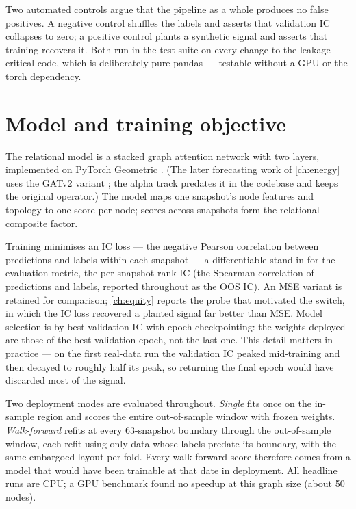 Two automated controls argue that the pipeline as a whole produces no
false positives. A negative control shuffles the labels and asserts that
validation IC collapses to zero; a positive control plants a synthetic
signal and asserts that training recovers it. Both run in the test suite
on every change to the leakage-critical code, which is deliberately pure
pandas --- testable without a GPU or the torch dependency.

\section{Model and training objective}
\label{sec:training}

The relational model is a stacked graph attention network
\cite{velickovic2018gat} with two layers, implemented on PyTorch
Geometric \cite{fey2019pyg}. (The later forecasting work of
\cref{ch:energy} uses the GATv2 variant \cite{brody2022gatv2}; the alpha
track predates it in the codebase and keeps the original operator.) The
model maps one snapshot's node features and topology to one score per
node; scores across snapshots form the relational composite factor.

Training minimises an IC loss --- the negative Pearson correlation
between predictions and labels within each snapshot --- a differentiable
stand-in for the evaluation metric, the per-snapshot rank-IC (the
Spearman correlation of predictions and labels, reported throughout as
the OOS IC). An MSE variant is retained for comparison;
\cref{ch:equity} reports the probe that motivated the switch, in which
the IC loss recovered a planted signal far better than MSE. Model
selection is by best validation IC with epoch checkpointing: the weights
deployed are those of the best validation epoch, not the last one. This
detail matters in practice --- on the first real-data run the validation
IC peaked mid-training and then decayed to roughly half its peak, so
returning the final epoch would have discarded most of the signal.

Two deployment modes are evaluated throughout. \emph{Single} fits once on
the in-sample region and scores the entire out-of-sample window with
frozen weights. \emph{Walk-forward} refits at every 63-snapshot boundary
through the out-of-sample window, each refit using only data whose labels
predate its boundary, with the same embargoed layout per fold. Every
walk-forward score therefore comes from a model that would have been
trainable at that date in deployment. All headline runs are CPU; a GPU
benchmark found no speedup at this graph size (about 50 nodes).

